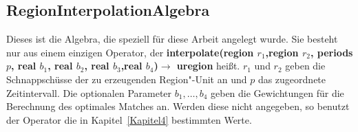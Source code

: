 \subsection{RegionInterpolationAlgebra}

Dieses ist die Algebra, die speziell für diese Arbeit  angelegt wurde. Sie besteht nur aus einem einzigen Operator, der \textbf{interpolate(region  $r_1$,region $r_2$, periods $p$, real $b_1$, real $b_2$, real $b_3$,real $b_4$)$\rightarrow$ uregion} heißt. $r_1$ und $r_2$ geben die Schnappschüsse der zu erzeugenden Region"-Unit an und $p$ das zugeordnete Zeitintervall. Die optionalen Parameter $b_1,\hdots ,b_4$ geben die Gewichtungen für die Berechnung des optimales Matches an. Werden diese nicht angegeben, so benutzt der Operator die in Kapitel~\vref{Kapitel4} bestimmten Werte.

